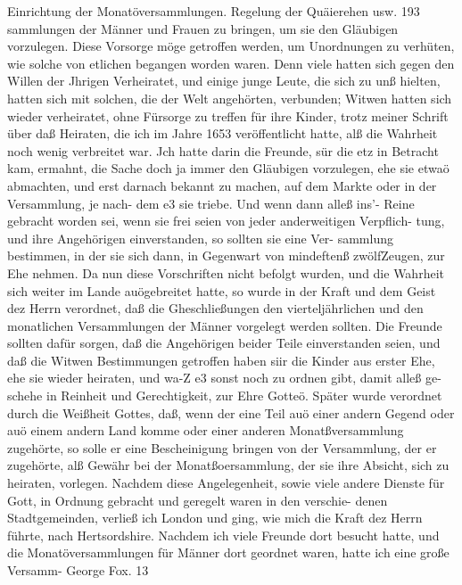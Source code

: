 Einrichtung der Monatöversammlungen. Regelung der Quäierehen usw. 193
sammlungen der Männer und Frauen zu bringen, um sie den
Gläubigen vorzulegen. Diese Vorsorge möge getroffen werden,
um Unordnungen zu verhüten, wie solche von etlichen begangen
worden waren. Denn viele hatten sich gegen den Willen der
Jhrigen Verheiratet, und einige junge Leute, die sich zu unß hielten,
hatten sich mit solchen, die der Welt angehörten, verbunden;
Witwen hatten sich wieder verheiratet, ohne Fürsorge zu treffen
für ihre Kinder, trotz meiner Schrift über daß Heiraten, die ich
im Jahre 1653 veröffentlicht hatte, alß die Wahrheit noch wenig
verbreitet war. Jch hatte darin die Freunde, sür die etz in
Betracht kam, ermahnt, die Sache doch ja immer den Gläubigen
vorzulegen, ehe sie etwaö abmachten, und erst darnach bekannt
zu machen, auf dem Markte oder in der Versammlung, je nach-
dem e3 sie triebe. Und wenn dann alleß ins'- Reine gebracht
worden sei, wenn sie frei seien von jeder anderweitigen Verpflich-
tung, und ihre Angehörigen einverstanden, so sollten sie eine Ver-
sammlung bestimmen, in der sie sich dann, in Gegenwart von
mindeftenß zwölfZeugen, zur Ehe nehmen. Da nun diese Vorschriften
nicht befolgt wurden, und die Wahrheit sich weiter im Lande
auögebreitet hatte, so wurde in der Kraft und dem Geist dez
Herrn verordnet, daß die Gheschließungen den vierteljährlichen
und den monatlichen Versammlungen der Männer vorgelegt werden
sollten. Die Freunde sollten dafür sorgen, daß die Angehörigen
beider Teile einverstanden seien, und daß die Witwen Bestimmungen
getroffen haben siir die Kinder aus erster Ehe, ehe sie wieder
heiraten, und wa-Z e3 sonst noch zu ordnen gibt, damit alleß ge-
schehe in Reinheit und Gerechtigkeit, zur Ehre Gotteö. Später
wurde verordnet durch die Weißheit Gottes, daß, wenn der eine
Teil auö einer andern Gegend oder auö einem andern Land komme
oder einer anderen Monatßversammlung zugehörte, so solle er eine
Bescheinigung bringen von der Versammlung, der er zugehörte,
alß Gewähr bei der Monatßoersammlung, der sie ihre Absicht,
sich zu heiraten, vorlegen.
Nachdem diese Angelegenheit, sowie viele andere Dienste für
Gott, in Ordnung gebracht und geregelt waren in den verschie-
denen Stadtgemeinden, verließ ich London und ging, wie mich
die Kraft dez Herrn führte, nach Hertsordshire. Nachdem ich
viele Freunde dort besucht hatte, und die Monatöversammlungen
für Männer dort geordnet waren, hatte ich eine große Versamm-
George Fox. 13


